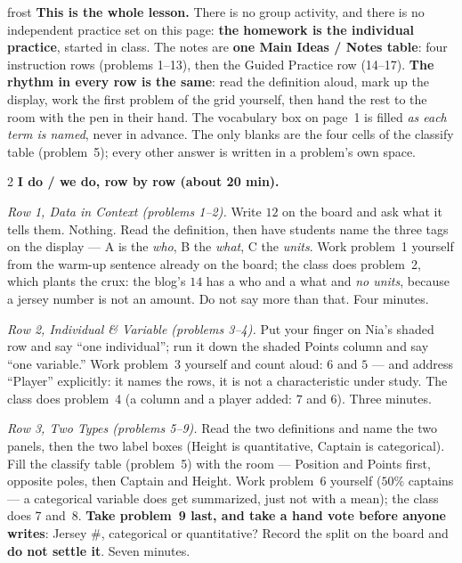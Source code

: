 \documentclass[10pt]{article}
\begin{document}
\boxguard
\begin{skillbox}{frost}
\textbf{This is the whole lesson.} There is no group activity, and there is no independent
practice set on this page: \textbf{the homework is the individual practice}, started in class.
The notes are \textbf{one Main Ideas / Notes table}: four instruction rows (problems 1--13),
then the Guided Practice row (14--17). \textbf{The rhythm in every row is the same}: read the
definition aloud, mark up the display, work the first problem of the grid yourself, then hand
the rest to the room with the pen in their hand. The vocabulary box on page~1 is filled
\emph{as each term is named}, never in advance. The only blanks are the four cells of the
classify table (problem~5); every other answer is written in a problem's own space.
\begin{multicols}{2}
\textbf{I do / we do, row by row (about 20 min).}

\emph{Row 1, Data in Context (problems 1--2).} Write $12$ on the board and ask what it tells
them. Nothing. Read the definition, then have students name the three tags on the display ---
A is the \emph{who}, B the \emph{what}, C the \emph{units}. Work problem~1 yourself from the
warm-up sentence already on the board; the class does problem~2, which plants the crux: the
blog's $14$ has a who and a what and \emph{no units}, because a jersey number is not an
amount. Do not say more than that. Four minutes.

\emph{Row 2, Individual \& Variable (problems 3--4).} Put your finger on Nia's shaded row and
say ``one individual''; run it down the shaded Points column and say ``one variable.'' Work
problem~3 yourself and count aloud: $6$ and $5$ --- and address ``Player'' explicitly: it
names the rows, it is not a characteristic under study. The class does problem~4 (a column
and a player added: $7$ and $6$). Three minutes.

\emph{Row 3, Two Types (problems 5--9).} Read the two definitions and name the two panels,
then the two label boxes (Height is quantitative, Captain is categorical). Fill the classify
table (problem~5) with the room --- Position and Points first, opposite poles, then Captain
and Height. Work problem~6 yourself ($50\%$ captains --- a categorical variable does get
summarized, just not with a mean); the class does 7 and~8. \textbf{Take problem~9 last, and
take a hand vote before anyone writes}: Jersey \#, categorical or quantitative? Record the
split on the board and \textbf{do not settle it}. Seven minutes.


\end{multicols}
\end{skillbox}
\end{document}
